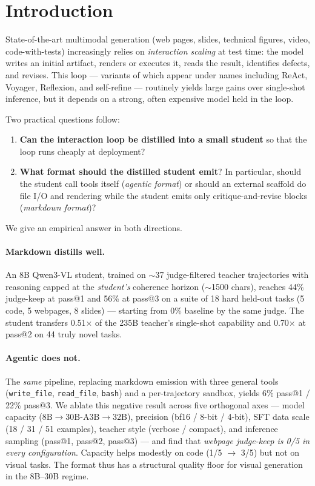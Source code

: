\documentclass[11pt]{article}
\begin{document}
\section{Introduction}
\label{sec:intro}

State-of-the-art multimodal generation (web pages, slides, technical figures, video, code-with-tests) increasingly relies on \emph{interaction scaling} at test time: the model writes an initial artifact, renders or executes it, reads the result, identifies defects, and revises. This loop --- variants of which appear under names including ReAct, Voyager, Reflexion, and self-refine --- routinely yields large gains over single-shot inference, but it depends on a strong, often expensive model held in the loop.

Two practical questions follow:
\begin{enumerate}[leftmargin=*]
  \item \textbf{Can the interaction loop be distilled into a small student} so that the loop runs cheaply at deployment?
  \item \textbf{What format should the distilled student emit}? In particular, should the student call tools itself (\emph{agentic format}) or should an external scaffold do file I/O and rendering while the student emits only critique-and-revise blocks (\emph{markdown format})?
\end{enumerate}

We give an empirical answer in both directions.

\paragraph{Markdown distills well.} An 8B Qwen3-VL student, trained on $\sim$37 judge-filtered teacher trajectories with reasoning capped at the \emph{student's} coherence horizon ($\sim$1500 chars), reaches 44\% judge-keep at pass@1 and 56\% at pass@3 on a suite of 18 hard held-out tasks (5 code, 5 webpages, 8 slides) --- starting from 0\% baseline by the same judge. The student transfers 0.51$\times$ of the 235B teacher's single-shot capability and 0.70$\times$ at pass@2 on 44 truly novel tasks.

\paragraph{Agentic does not.} The \emph{same} pipeline, replacing markdown emission with three general tools (\texttt{write\_file}, \texttt{read\_file}, \texttt{bash}) and a per-trajectory sandbox, yields 6\% pass@1 / 22\% pass@3. We ablate this negative result across five orthogonal axes --- model capacity ($8\mathrm{B} \to 30\mathrm{B\text{-}A3B} \to 32\mathrm{B}$), precision (bf16 / 8-bit / 4-bit), SFT data scale (18 / 31 / 51 examples), teacher style (verbose / compact), and inference sampling (pass@1, pass@2, pass@3) --- and find that \emph{webpage judge-keep is 0/5 in every configuration}. Capacity helps modestly on code (1/5 $\to$ 3/5) but not on visual tasks. The format thus has a structural quality floor for visual generation in the 8B--30B regime.
\end{document}
